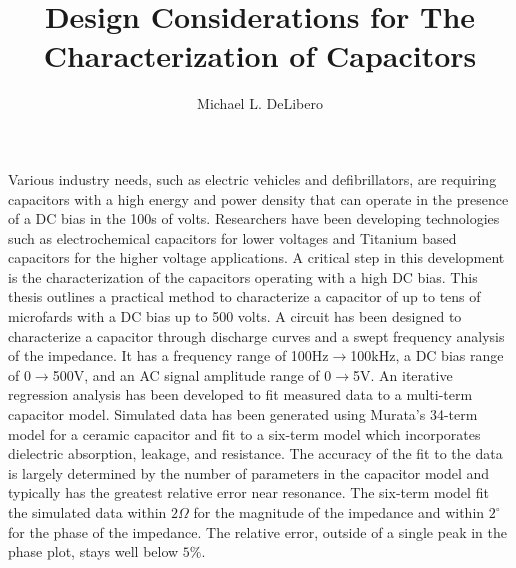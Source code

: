 \documentclass{article}
\title{Design Considerations for The Characterization of Capacitors}
\author{Michael L. DeLibero}
\begin{document}
    \date{}
    \maketitle
\fi

\label{sec:abstract}
Various industry needs, such as electric vehicles and defibrillators, are requiring capacitors with a high energy and power density that can operate in the presence of a DC bias in the 100s of volts. Researchers have been developing technologies such as electrochemical capacitors for lower voltages and Titanium based capacitors for the higher voltage applications. A critical step in this development is the characterization of the capacitors operating with a high DC bias.
This thesis outlines a practical method to characterize a capacitor of up to tens of microfards with a DC bias up to 500 volts. A circuit has been designed to characterize a capacitor through discharge curves and a swept frequency analysis of the impedance. It has a frequency range of 100Hz$\rightarrow$100kHz, a DC bias range of 0$\rightarrow$500V, and an AC signal amplitude range of 0$\rightarrow$5V.
An iterative regression analysis has been developed to fit measured data to a multi-term capacitor model. Simulated data has been generated using Murata’s 34-term model for a ceramic capacitor and fit to a six-term model which incorporates dielectric absorption, leakage, and resistance. The accuracy of the fit to the data is largely determined by the number of parameters in the capacitor model and typically has the greatest relative error near resonance. The six-term model fit the simulated data within $2 \Omega$ for the magnitude of the impedance and within $2^{\circ}$ for the phase of the impedance. The relative error, outside of a single peak in the phase plot, stays well below $5\%$.

\ifOnlyAbstract
    
\end{document}
